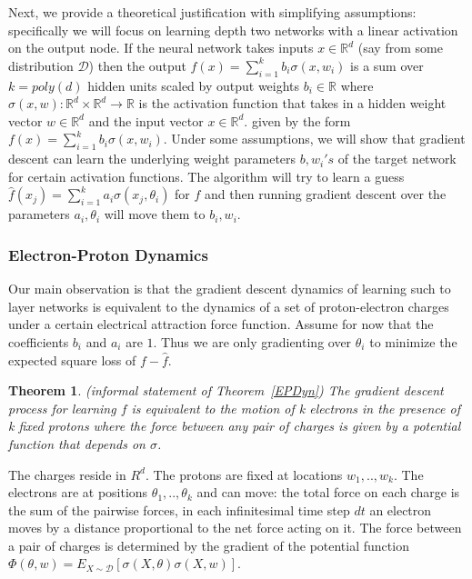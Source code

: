 \documentclass{article}
\newtheorem{theorem}{Theorem}[section]
\newcommand{\R}{{\mathbb{R}}}
\begin{document}
Next, we provide a theoretical justification with simplifying assumptions: specifically we will focus on learning depth two networks with a linear activation on the output node. If the neural network takes inputs  $x \in \R^d$ (say from some distribution $\mathcal{D}$) then the output $f(x) = \sum_{i=1}^k b_i\sigma(x,w_i)$ is a sum over $k = poly(d)$ hidden units scaled by output weights $b_i \in \R$ where $\sigma(x,w):\R^d \times \R^d\to \R$ is the activation function that takes in a hidden weight vector $w \in \R^d$ and the input vector $x \in \R^d$.
given by the form $f(x) = \sum_{i=1}^k b_i\sigma(x,w_i)$. Under some assumptions, we will show that gradient descent can learn the underlying weight parameters $b, w_i's$ of the target network for certain activation functions. The algorithm will try to learn a guess $\widehat{f}(x_j) = \sum_{i=1}^k a_i \sigma(x_j,\theta_i)$ for $f$ and then running gradient descent over the parameters $a_i, \theta_i$ will move them to $b_i, w_i$. 

\subsubsection{Electron-Proton Dynamics}

Our main observation is that the gradient descent dynamics of learning such to layer networks is equivalent to the dynamics of a set of proton-electron charges under a certain electrical attraction force function. Assume for now that the coefficients $b_i$ and $a_i$ are $1$. Thus we are only gradienting over $\theta_i$ to minimize the expected square loss of $f-\widehat{f}$.

\begin{theorem}(informal statement of Theorem~\ref{EPDyn})
The gradient descent process for learning $f$ is equivalent to the motion of k electrons in the presence of k fixed protons where the force between any pair of charges is given by a potential function that depends on $\sigma$.
\end{theorem}

The charges reside in $R^d$. The protons are fixed at locations $w_1,..,w_k$. The electrons are at positions $\theta_1,..,\theta_k$ and can move: the total force on each charge is the sum of the pairwise forces, in each infinitesimal time step $dt$ an electron moves by a distance proportional to the net force acting on it. The force between a pair of charges is determined by the gradient of the potential function $\Phi(\theta, w) = E_{X\sim \mathcal{D}}[ \sigma(X,\theta) \sigma(X,w)]$.  
\end{document}
